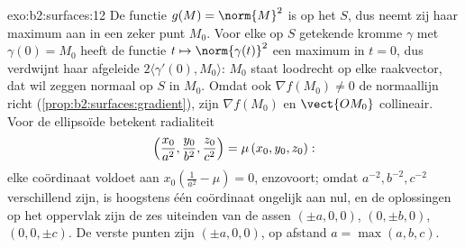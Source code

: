\begin{solution}{exo:b2:surfaces:12}
De functie $g(M) = \norm{M}^2$ is  op het  $S$, dus
neemt zij haar maximum aan in een zeker punt $M_0$. Voor elke op
$S$ getekende kromme $\gamma$ met $\gamma(0) = M_0$ heeft de
functie $t \mapsto \norm{\gamma(t)}^2$ een maximum in $t = 0$, dus
verdwijnt haar afgeleide $2\langle\gamma'(0), M_0\rangle$: $M_0$
staat loodrecht op elke raakvector, dat wil zeggen normaal op $S$
in $M_0$. Omdat ook $\nabla f(M_0) \neq 0$ de normaallijn richt
(\cref{prop:b2:surfaces:gradient}), zijn $\nabla f(M_0)$ en
$\vect{OM_0}$ collineair. Voor de ellipsoïde betekent radialiteit
\[
\Bigl(\frac{x_0}{a^2}, \frac{y_0}{b^2},
\frac{z_0}{c^2}\Bigr) = \mu\,(x_0, y_0, z_0) :
\]
elke coördinaat voldoet aan $x_0(\frac1{a^2} - \mu) = 0$,
enzovoort; omdat $a^{-2}, b^{-2}, c^{-2}$ verschillend zijn, is
hoogstens één coördinaat ongelijk aan nul, en de oplossingen op het
oppervlak zijn de zes uiteinden van de assen $(\pm a, 0, 0)$, $(0,
\pm b, 0)$, $(0, 0, \pm c)$. De verste punten zijn $(\pm a, 0, 0)$,
op afstand $a = \max(a,b,c)$.
\end{solution}

